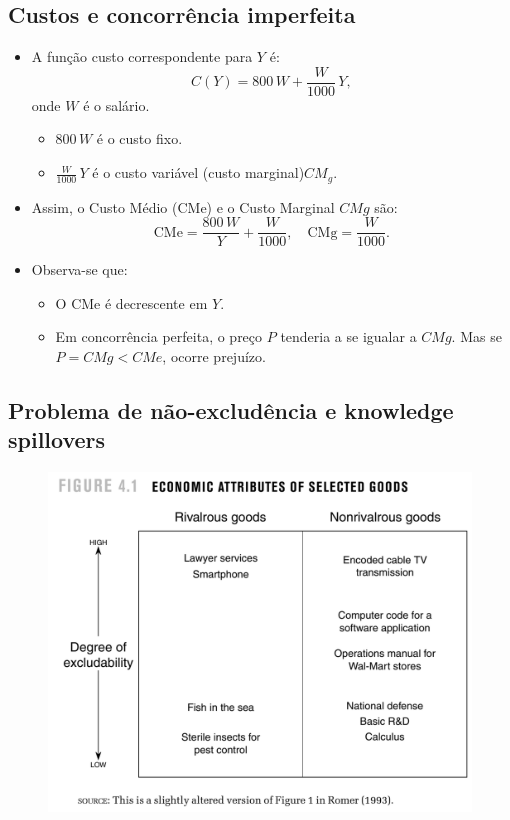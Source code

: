\documentclass[a4paper,12pt]{article}[abntex2]
\begin{document}
\subsection{\textbf{Custos e concorrência imperfeita}}
\begin{itemize}
    \item A função custo correspondente para $Y$ é:
    \[
      C(Y) = 800\,W + \frac{W}{1000}\,Y,
    \]
    onde $W$ é o salário.
    \begin{itemize}
      \item $800\,W$ é o custo fixo.
      \item $\frac{W}{1000}\,Y$ é o custo variável (custo marginal)\(CM_g\).
    \end{itemize}

    \item Assim, o Custo Médio (CMe) e o Custo Marginal \(CMg\) são:
    \[
      \text{CMe} = \frac{800\,W}{Y} + \frac{W}{1000},
      \quad
      \text{CMg} = \frac{W}{1000}.
    \]

    \item Observa-se que:
    \begin{itemize}
        \item O CMe é decrescente em $Y$.
        \item Em concorrência perfeita, o preço $P$ tenderia a se igualar a $CMg$. 
              Mas se $P = CMg < CMe$, ocorre prejuízo.
    \end{itemize}
\end{itemize}


\subsection{\textbf{Problema de não-excludência e knowledge spillovers}}
\begin{figure}[H]
    \centering
    \includegraphics[width=0.7\linewidth]{Imagens/a14i1.png}
\end{figure}
\end{document}
